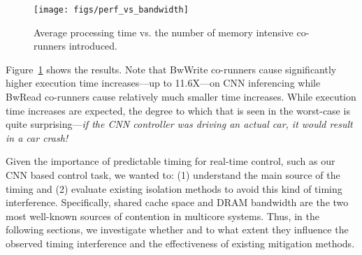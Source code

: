\begin{figure}[h]
  \centering
  \texttt{[image: figs/perf\_vs\_bandwidth]}
  \caption{Average processing time vs. the number of memory
    intensive co-runners introduced.}
  \label{fig:perf_vs_bandwidth}
\end{figure}


Figure~\ref{fig:perf_vs_bandwidth} shows the results. Note
that BwWrite co-runners cause significantly higher execution time
increases---up to 11.6X---on CNN inferencing while BwRead co-runners
cause relatively much smaller time increases. While execution time
increases are expected, the degree to which that is seen in the worst-case 
is quite surprising---\emph{if the CNN controller was driving an actual 
car, it would result in a car crash!}

Given the importance of predictable timing for real-time control, such
as our CNN based control task, we wanted to: (1) understand the main
source of the timing and (2) evaluate existing isolation methods to
avoid this kind of timing interference. Specifically, shared cache
space and DRAM bandwidth are the two most well-known sources of contention
in multicore systems. Thus, in the following sections, we investigate whether
and to what extent they influence the observed timing interference and 
the effectiveness of existing mitigation methods.



